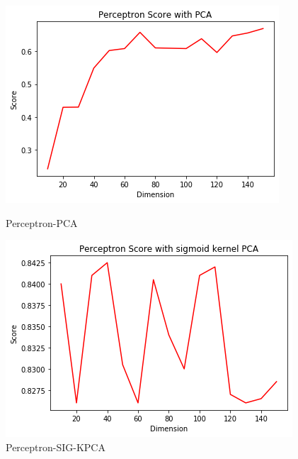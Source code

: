 \documentclass[12pt]{article}
\begin{document}
\begin{figure}[htb]
	\centering
	\begin{minipage}{.3\textwidth}
		\centering
		\includegraphics[width=\linewidth]{./exp-figs/P-PCA.png}
		\caption{Perceptron-PCA}
		\label{fig:P-PCA}
	\end{minipage}%
	\begin{minipage}{0.3\textwidth}
		\centering
		\includegraphics[width=\linewidth]{./exp-figs/P-SIG-KPCA.png}
		\caption{Perceptron-SIG-KPCA}
		\label{fig:P-SIG-KPCA}
	\end{minipage}
	\begin{minipage}{0.3\textwidth}
		\centering

\end{minipage}
\end{figure}
\end{document}
